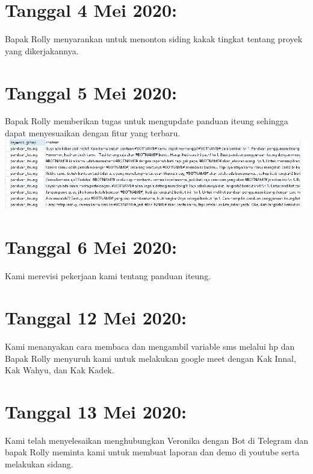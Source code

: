 \documentclass{article}
\begin{document}
\section{Tanggal 4 Mei 2020:}
Bapak Rolly menyarankan untuk menonton siding kakak tingkat tentang proyek yang dikerjakannya.
	\newline
	\newline
	
\section{Tanggal 5 Mei 2020:}
Bapak Rolly memberikan tugas untuk mengupdate panduan iteung sehingga dapat menyesuaikan dengan fitur yang terbaru.
	\newline
	\includegraphics[scale=0.5]{4.jpg}
	\newline

\section{Tanggal 6 Mei 2020:}
Kami merevisi pekerjaan kami tentang panduan iteung.
	\newline
	\newline

\section{Tanggal 12 Mei 2020:}
Kami menanyakan cara membaca dan mengambil variable sms melalui hp dan Bapak Rolly menyuruh kami untuk melakukan google meet dengan Kak Innal, Kak Wahyu, dan Kak Kadek.
	\newline
	\newline

\section{Tanggal 13 Mei 2020:}
Kami telah menyelesaikan menghubungkan Veronika dengan Bot di Telegram dan bapak Rolly meminta kami untuk membuat laporan dan demo di youtube serta melakukan sidang. 
	\newline
	\newline
	
\end{document}
